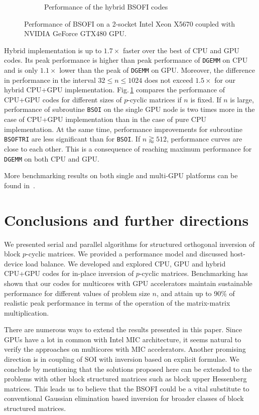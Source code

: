 \documentclass{llncs}
\newcommand{\Bsoftri}{\texttt{BSOFTRI}\xspace}
\newcommand{\Bsoi}{\texttt{BSOI}\xspace}
\newcommand{\Gemm}{\texttt{DGEMM}\xspace}
\begin{document}
\begin{figure}[t]
\begin{subfigure}[t]{0.49\linewidth}
    \caption{Performance of the hybrid BSOFI codes\label{fig:perf_hybrid_BSOFTRI_BSOI}}
  \end{subfigure}
  \caption{Performance of BSOFI on 
    a 2-socket Intel Xeon X5670 coupled with NVIDIA GeForce GTX480 GPU.} 
  \label{fig:performance_BSO}
\end{figure}
%
Hybrid implementation is up to $1.7\times$ faster over the 
best of CPU and GPU codes.
Its peak performance is higher than peak 
performance of \Gemm on CPU 
and is only $1.1\times$ lower than the peak of \Gemm on GPU.
Moreover, 
the difference in performance in the interval $32 \leq n \leq 1024$ 
does not exceed $1.5\times$ for our hybrid CPU+GPU implementation. %
Fig.\,\ref{fig:perf_hybrid_BSOFTRI_BSOI}
compares 
the performance of CPU+GPU codes for different sizes of $p$-cyclic matrices if $n$ is fixed. 
If $n$ is large, performance of subroutine \Bsoi on the single GPU node 
is two times more in the case of CPU+GPU implementation  
than in the case of pure CPU implementation.
At the same time, 
performance improvements for subroutine \Bsoftri 
are less significant than for \Bsoi.
If $n \gtrapprox 512$, performance curves are close to each other. 
This is a consequence of reaching maximum performance for {\tt DGEMM}
on both CPU and GPU. 

More benchmarking results on both single and multi-GPU platforms 
can be found in~\cite{GogolenkoBai13}.

\section{Conclusions and further directions}
\label{sec:conclusions}

We presented serial and parallel algorithms for structured orthogonal inversion
of block $p$-cyclic matrices.
We provided a performance model and discussed host-device load balance.
We developed and explored CPU, GPU and hybrid CPU+GPU codes
for in-place inversion of $p$-cyclic matrices.
Benchmarking has shown that 
our codes for multicores with GPU accelerators
maintain sustainable performance for different values 
of problem size $n$, and attain up to 90\% of realistic peak performance in 
terms of the operation of the matrix-matrix multiplication. 

There are numerous ways to extend the results presented in this paper.
Since GPUs have a lot in common with Intel MIC architecture, 
it seems natural to verify the approaches
on multicores with MIC accelerators.
Another promising direction is in coupling of 
SOI with inversion based on explicit formulae. 
We conclude by mentioning 
that the solutions proposed here can be extended to 
the problems with other block structured matrices such as
block upper Hessenberg matrices. 
This leads us to believe that the BSOFI could be a vital substitute 
to conventional Gaussian elimination based inversion
for broader classes of block structured matrices.



\end{document}
